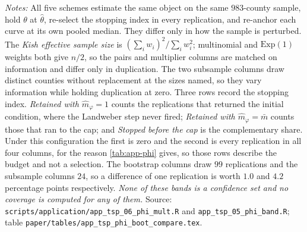 \documentclass[
  12pt]{article}
\newcommand{\1}[1]{\mathds{1}\left[#1\right]}
\theoremstyle{plain}
\theoremstyle{definition}
\theoremstyle{definition}
\theoremstyle{remark}
\begin{document}
\begin{table}[!htbp]
\begin{threeparttable}
%
\setlength{\tabcolsep}{4pt}

\begin{tablenotes}\footnotesize
\item \textit{Notes:} All five schemes estimate the same object on the same
$983$-county sample, hold $\theta$ at $\hat\theta$, re-select the stopping index
in every replication, and re-anchor each curve at its own pooled median. They
differ only in how the sample is perturbed. The \emph{Kish effective sample
size} is $(\sum_i w_i)^2/\sum_i w_i^2$; multinomial and $\mathrm{Exp}(1)$
weights both give $n/2$, so the pairs and multiplier columns are matched on
information and differ only in duplication. The two subsample columns draw
distinct counties without replacement at the sizes named, so they vary
information while holding duplication at zero. Three rows record the stopping index. \emph{Retained with $\hat m_\varphi=1$}
counts the replications that returned the initial condition, where the Landweber
step never fired; \emph{Retained with $\hat m_\varphi=\bar m$} counts those that
ran to the cap; and \emph{Stopped before the cap} is the complementary share.
Under this configuration the first is zero and the second is every replication
in all four columns, for the reason \cref{tab:app-phi} gives, so those rows
describe the budget and not a selection. The bootstrap columns draw $99$ replications and
the subsample columns $24$, so a difference of one replication is worth
$1.0$ and $4.2$ percentage points respectively. \emph{None of these bands is a
confidence set and no coverage is computed for any of them.} Source:
\texttt{scripts/application/app\_tsp\_06\_phi\_mult.R} and
\texttt{app\_tsp\_05\_phi\_band.R}; table
\texttt{paper/tables/app\_tsp\_phi\_boot\_compare.tex}.
\end{tablenotes}
\end{threeparttable}
\end{table}
\end{document}
